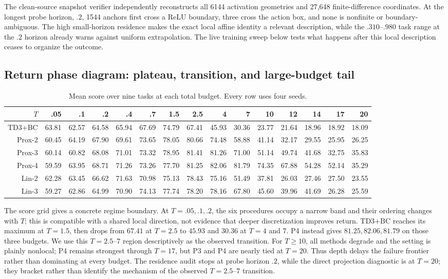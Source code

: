 \documentclass[twoside]{article}
\begin{document}
The clean-source snapshot verifier independently reconstructs all 6144
activation geometries and 27,648 finite-difference coordinates. At the longest
probe horizon, $.2$, 1544 anchors first cross a ReLU boundary, three cross the
action box, and none is nonfinite or boundary-ambiguous. The high
small-horizon residence makes the exact local affine identity a relevant
description, while the $.310$--$.980$ task range at the $.2$ horizon already
warns against uniform extrapolation. The live training sweep below tests what
happens after this local description ceases to organize the outcome.

\subsection{Return phase diagram: plateau, transition, and large-budget tail}

\begin{table}[t]
\caption{Mean score over nine tasks at each total budget. Every row uses four seeds.}
\centering
\small
\setlength{\tabcolsep}{4.5pt}
\begin{tabular}{r|rrrrrrrrrrrrrr}
\toprule
$T$&.05&.1&.2&.4&.7&1.5&2.5&4&7&10&12&14&17&20\\
\midrule
TD3+BC&63.81&62.57&64.58&65.94&67.69&74.79&67.41&45.93&30.36&23.77&21.64&18.96&18.92&18.09\\
Prox-2&60.45&64.19&67.90&69.61&73.65&78.05&80.66&74.48&58.88&41.14&32.17&29.55&25.95&26.25\\
Prox-3&60.14&60.82&68.08&71.01&73.32&78.95&81.41&81.26&71.00&51.14&49.74&41.68&32.75&35.83\\
Prox-4&59.59&63.95&68.71&71.26&73.26&77.70&81.25&82.06&81.79&74.35&67.88&54.28&52.14&35.29\\
Lin-2&62.28&63.45&66.62&71.63&70.98&75.13&78.43&75.16&51.49&37.81&26.03&27.46&27.50&23.55\\
Lin-3&59.27&62.86&64.99&70.90&74.13&77.74&78.20&78.16&67.80&45.60&39.96&41.69&26.28&25.59\\
\bottomrule
\end{tabular}
\label{tab:tau_means}
\end{table}

The score grid gives a concrete regime boundary. At $T=.05,.1,.2$, the six
procedures occupy a narrow band and their ordering changes with $T$; this is
compatible with a shared local direction, not evidence that deeper
discretization improves return. TD3+BC reaches its maximum at $T=1.5$, then
drops from $67.41$ at $T=2.5$ to $45.93$ and $30.36$ at $T=4$ and $7$. P4
instead gives $81.25,82.06,81.79$ on those three budgets. We use this
$T=2.5$--$7$ region descriptively as the observed transition. For $T\ge10$,
all methods degrade and the setting is plainly nonlocal; P4 remains strongest
through $T=17$, but P3 and P4 are nearly tied at $T=20$. Thus depth delays the
failure frontier rather than dominating at every budget.
The residence audit stops at probe horizon $.2$, while the direct projection
diagnostic is at $T=20$; they bracket rather than identify the mechanism of the
observed $T=2.5$--$7$ transition.
\end{document}
